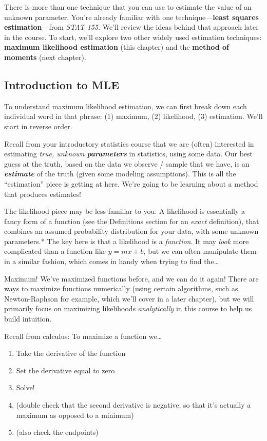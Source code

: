 \documentclass[
  letterpaper,
  DIV=11,
  numbers=noendperiod]{scrreprt}
\begin{document}
There is more than one technique that you can use to estimate the value
of an unknown parameter. You're already familiar with one
technique---\textbf{least squares estimation}---from \emph{STAT 155}.
We'll review the ideas behind that approach later in the course. To
start, we'll explore two other widely used estimation techniques:
\textbf{maximum likelihood estimation} (this chapter) and the
\textbf{method of moments} (next chapter).

\subsection*{Introduction to MLE}\label{introduction-to-mle}

To understand maximum likelihood estimation, we can first break down
each individual word in that phrase: (1) maximum, (2) likelihood, (3)
estimation. We'll start in reverse order.

Recall from your introductory statistics course that we are (often)
interested in estimating \emph{true, unknown \textbf{parameters}} in
statistics, using some data. Our best guess at the truth, based on the
data we observe / sample that we have, is an \textbf{\emph{estimate}} of
the truth (given some modeling assumptions). This is all the
``estimation'' piece is getting at here. We're going to be learning
about a method that produces estimates!

The likelihood piece may be less familiar to you. A likelihood is
essentially a fancy form of a function (see the Definitions section for
an \emph{exact} definition), that combines an assumed probability
distribution for your data, with some unknown parameters.* The key here
is that a likelihood is a \emph{function}. It may \emph{look} more
complicated than a function like \(y = mx + b\), but we can often
manipulate them in a similar fashion, which comes in handy when trying
to find the\ldots{}

Maximum! We've maximized functions before, and we can do it again! There
are ways to maximize functions numerically (using certain algorithms,
such as Newton-Raphson for example, which we'll cover in a later
chapter), but we will primarily focus on maximizing likelihoods
\emph{analytically} in this course to help us build intuition.

Recall from calculus: To maximize a function we\ldots{}

\begin{enumerate}
\def\labelenumi{\arabic{enumi}.}
\item
  Take the derivative of the function
\item
  Set the derivative equal to zero
\item
  Solve!
\item
  (double check that the second derivative is negative, so that it's
  actually a maximum as opposed to a minimum)
\item
  (also check the endpoints)
\end{enumerate}
\end{document}
